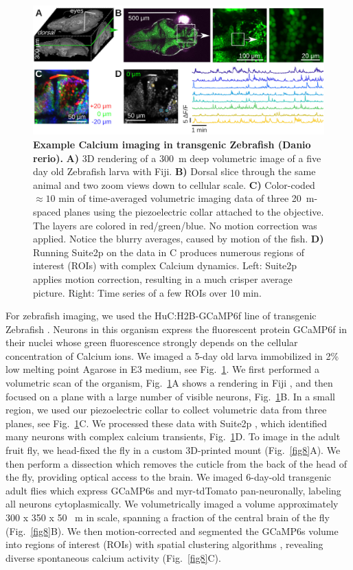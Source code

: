 \documentclass[10pt,letterpaper]{article}
\begin{document}
\begin{figure}[t]
    \includegraphics[width=\textwidth]{fig7.jpg}
    \caption{{\bf Example Calcium imaging in transgenic Zebrafish (Danio rerio).} \textbf{A)} 3D rendering of a 300~\textmu m deep volumetric image of a five day old Zebrafish larva with Fiji\cite{Schindelin2019}. \textbf{B)} Dorsal slice through the same animal and two zoom views down to cellular scale. \textbf{C)} Color-coded $\approx10\text{ min}$ of time-averaged volumetric imaging data of three 20~\textmu m-spaced planes using the piezoelectric collar attached to the objective. The layers are colored in red/green/blue. No motion correction was applied. Notice the blurry averages, caused by motion of the fish. \textbf{D)} Running Suite2p on the data in C produces numerous regions of interest (ROIs) with complex Calcium dynamics. Left: Suite2p applies motion correction, resulting in a much crisper average picture. Right: Time series of a few ROIs over 10 min.}
    \label{fig7}
\end{figure}
%
%
For zebrafish imaging, we used the HuC:H2B-GCaMP6f line of transgenic Zebrafish \cite{Cong2017}. Neurons in this organism express the fluorescent protein GCaMP6f in their nuclei whose green fluorescence strongly depends on the cellular concentration of Calcium ions. We imaged a 5-day old larva immobilized in 2\% low melting point Agarose in E3 medium, see Fig.~\ref{fig7}. We first performed a volumetric scan of the organism, Fig.~\ref{fig7}A shows a rendering in Fiji \cite{Schindelin2019}, and then focused on a plane with a large number of visible neurons, Fig.~\ref{fig7}B. In a small region, we used our piezoelectric collar to collect volumetric data from three planes, see Fig.~\ref{fig7}C. We processed these data with Suite2p \cite{Pachitariu2016}, which identified many neurons with complex calcium transients, Fig.~\ref{fig7}D.\newline
To image in the adult fruit fly, we head-fixed the fly in a custom 3D-printed mount \cite{Pacheco2021} (Fig.~\ref{fig8}A). We then perform a dissection which removes the cuticle from the back of the head of the fly, providing optical access to the brain. We imaged 6-day-old transgenic adult flies which express GCaMP6s and myr-tdTomato pan-neuronally, labeling all neurons cytoplasmically. We volumetrically imaged a volume approximately 300 x 350 x 50 ~\textmu m in scale, spanning a fraction of the central brain of the fly (Fig.~\ref{fig8}B). We then motion-corrected and segmented the GCaMP6s volume into regions of interest (ROIs) with spatial clustering algorithms \cite{Pacheco2021}, revealing diverse spontaneous calcium activity (Fig.~\ref{fig8}C). 
\end{document}
